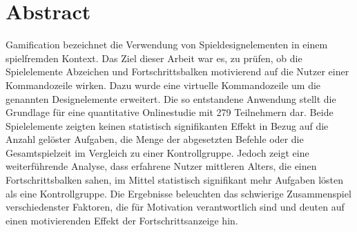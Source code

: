\section{Abstract}
Gamification bezeichnet die Verwendung von Spieldesignelementen in einem spielfremden Kontext. Das Ziel dieser Arbeit war es, zu prüfen, ob die Spielelemente Abzeichen und Fortschrittsbalken motivierend auf die Nutzer einer Kommandozeile wirken. Dazu wurde eine virtuelle Kommandozeile um die genannten Designelemente erweitert. Die so entstandene Anwendung stellt die Grundlage für eine quantitative Onlinestudie mit 279 Teilnehmern dar. Beide Spielelemente zeigten keinen statistisch signifikanten Effekt in Bezug auf die Anzahl gelöster Aufgaben, die Menge der abgesetzten Befehle oder die Gesamtspielzeit im Vergleich zu einer Kontrollgruppe. Jedoch zeigt eine weiterführende Analyse, dass erfahrene Nutzer mittleren Alters, die einen Fortschrittsbalken sahen, im Mittel statistisch signifikant mehr Aufgaben lösten als eine Kontrollgruppe. Die Ergebnisse beleuchten das schwierige Zusammenspiel verschiedenster Faktoren, die für Motivation verantwortlich sind und deuten auf einen motivierenden Effekt der Fortschrittsanzeige hin. 